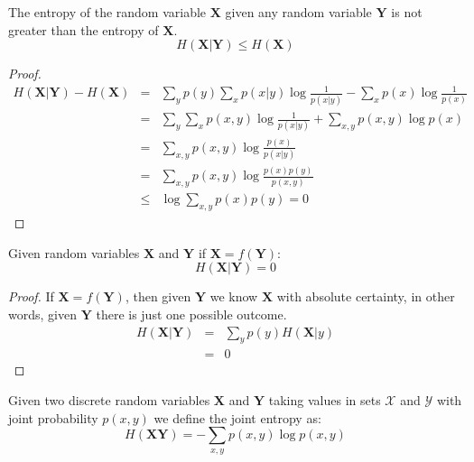 \begin{lemma}
\label{lem:entgeqcond}
The entropy of the random variable $\mathbf{X}$ given any random variable $\mathbf{Y}$ is not greater than the entropy of $\mathbf{X}$.
\begin{equation*}
H(\mathbf{X}|\mathbf{Y}) \leq H(\mathbf{X})
\end{equation*}
\end{lemma}
\begin{proof}
\begin{eqnarray}
H(\mathbf{X}|\mathbf{Y}) - H(\mathbf{X}) &=& \sum_{y }p(y) \sum_{x} p(x|y)\log \frac{1}{p(x|y)} - \sum_{x}p(x) \log  \frac{1}{p(x)}\nonumber \\
                         &=& \sum_{y}\sum_{x}p(x,y) \log \frac{1}{p(x|y)} + \sum_{x,y}p(x,y) \log  p(x) \nonumber \\
                         &=& \sum_{x,y}p(x,y) \log  \frac{p(x)}{p(x|y)} \nonumber \\
                         &=& \sum_{x,y}p(x,y) \log  \frac{p(x)p(y)}{p(x,y)} \nonumber \\
                         &\leq & \log \sum_{x,y} p(x) p(y) = 0
\end{eqnarray}
\end{proof}

\begin{lemma}
\label{lem:function}
Given random variables $\mathbf{X}$ and $\mathbf{Y}$ if $\mathbf{X}=f(\mathbf{Y})$: 
\begin{equation*}
H(\mathbf{X}|\mathbf{Y}) = 0
\end{equation*}
\end{lemma}
\begin{proof}
If $\mathbf{X}=f(\mathbf{Y})$, then given $\mathbf{Y}$ we know $\mathbf{X}$ with absolute certainty, in other words, given $\mathbf{Y}$ there is just one possible outcome.
\begin{eqnarray}
H(\mathbf{X}|\mathbf{Y})&=&\sum_{y}p(y) H(\mathbf{X}|y)\nonumber\\
         &=& 0
\end{eqnarray}
\end{proof}

\begin{definition}
Given two discrete random variables $\mathbf{X}$ and $\mathbf{Y}$ taking values in sets $\mathcal{X}$ and $\mathcal{Y}$ with joint probability $p(x,y)$ we define the joint entropy as:
\begin{equation}
H(\mathbf{XY}) = - \sum_{x,y} p(x,y)\log p(x,y)
\end{equation}
\end{definition}

